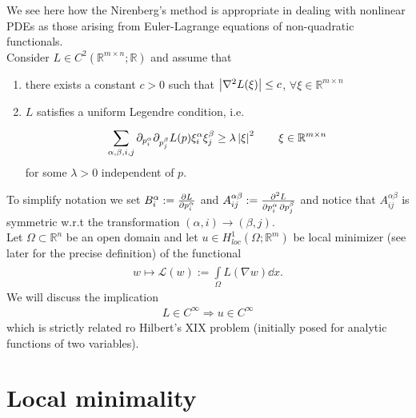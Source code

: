 We see here how the Nirenberg's method is appropriate in dealing with nonlinear PDEs as those arising from Euler-Lagrange equations of non-quadratic functionals. \\
Consider \( L \in C^{2}(\mathbb{R}^{m \times n}; \mathbb{R})  \) and assume that
\begin{enumerate}[label= (\roman*)]
	\item there exists a constant \(  c>0 \) such that \( \left\lvert\nabla ^{2}L(\xi) \right\rvert \leq c \), \( \forall \xi \in \mathbb{R}^{m \times n} \)
	\item \( L \) satisfies a uniform Legendre condition, i.e.
	      \begin{gather}
		      \sum\limits_{\alpha , \beta , i ,j }^{} \partial_{p_{i}^{\alpha }} \partial_{p_{j}^{\beta }} L(p) \xi _{i}^{\alpha } \xi _{j}^{\beta } \geq \lambda \left\lvert \xi \right\rvert^{2} \qquad \xi \in \mathbb{R}^{m \times n}
	      \end{gather}
	      for some \( \lambda >0  \) independent of \( p \).
\end{enumerate}
To simplify notation we set \( B_{i}^{\alpha }:= \pdv[{}]{L}{{p_{i}^{\alpha}}} \) and \( A_{ij}^{\alpha \beta } := \pdv[{}]{L}{{p_{i}^{\alpha}},p_{j}^{\beta }} \) and notice that \( A_{ij}^{\alpha \beta } \) is symmetric w.r.t the transformation \( (\alpha ,i)  \to (\beta , j) \). \\
Let \( \Omega \subset \mathbb{R}^{n} \) be an open domain and let \( u \in  H_{loc}^{1}(\Omega ; \mathbb{R}^{m})  \) be local minimizer (see later for the precise definition) of the functional
\begin{gather}
	w \mapsto \mathcal{L}(w) := \int\limits_{\Omega}^{} L(\nabla w)  \dd{x}.
\end{gather}
We will discuss the implication
\begin{gather}
	L \in  C^{\infty } \Rightarrow u \in  C^{\infty }
\end{gather}
which is strictly related ro Hilbert's XIX problem (initially posed for analytic functions of two variables).

\section{Local minimality}

